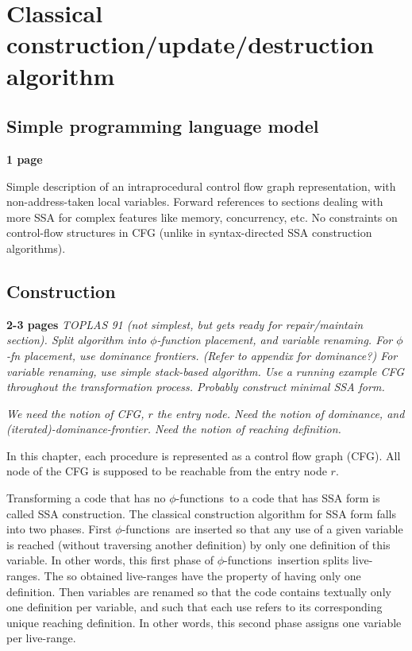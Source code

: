        \chapter{Classical construction/update/destruction algorithm }

\def\phiops{$\phi$-functions}
\def\phiop{$\phi$-function}
\section{Simple programming language model}
\textbf{1 page}

Simple description of an intraprocedural control flow graph
representation, with non-address-taken local variables.
Forward references to sections dealing with more SSA for complex
features like memory, concurrency, etc.
No constraints on control-flow structures in CFG
(unlike in syntax-directed SSA construction algorithms).


\section{Construction}
\textbf{2-3 pages}
{\em TOPLAS 91 (not simplest, but gets ready for repair/maintain section).
Split algorithm into $\phi$-function placement, and variable
renaming. For $\phi$-fn placement, use dominance frontiers.
(Refer to appendix for dominance?) 
For variable renaming, use simple stack-based algorithm.
Use a running example CFG throughout the transformation process.
Probably construct minimal SSA form.}

{\em We need the notion of CFG, $r$ the entry node. Need the notion of dominance, and (iterated)-dominance-frontier. Need the notion of reaching definition.}

In this chapter, each procedure is represented as a control flow graph (CFG). All node of the CFG is supposed to be reachable from the entry node $r$.

Transforming a code that has no \phiops\ to a code that has SSA form is called SSA construction. The classical construction algorithm for SSA form falls into two phases. 
First \phiops\ are inserted so that any use of a given variable is reached (without traversing another definition) by only one definition of this variable. In other words, this first phase of \phiops\ insertion splits live-ranges. The so obtained live-ranges have the property of having only one definition.
Then variables are renamed so that the code contains textually only one definition per variable, and such that each use refers to its corresponding unique reaching definition. In other words, this second phase assigns one variable per live-range. 

